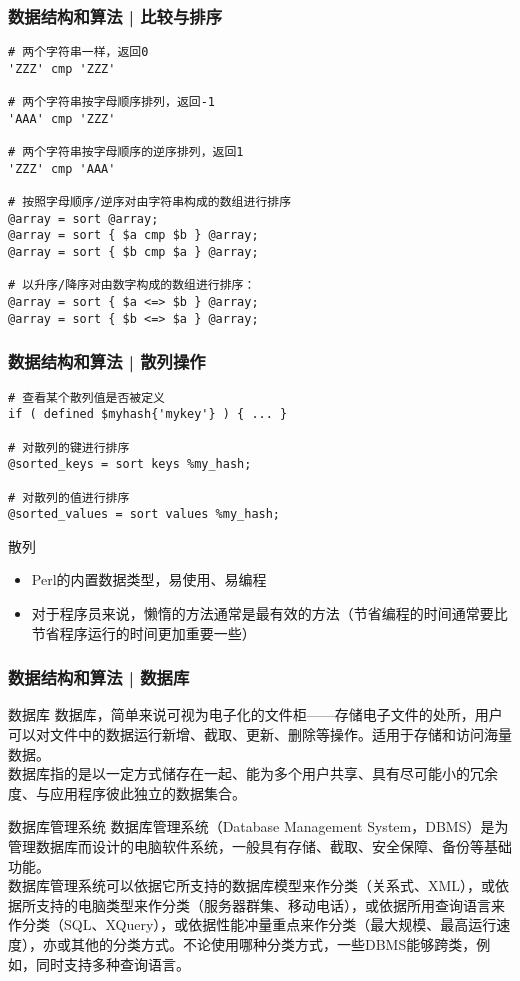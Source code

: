 \begin{frame}[fragile]
  \frametitle{数据结构和算法 | \alert{比较与排序}}
\begin{lstlisting}[basicstyle=\small\tt]
# 两个字符串一样，返回0
'ZZZ' cmp 'ZZZ'

# 两个字符串按字母顺序排列，返回-1
'AAA' cmp 'ZZZ'

# 两个字符串按字母顺序的逆序排列，返回1
'ZZZ' cmp 'AAA'

# 按照字母顺序/逆序对由字符串构成的数组进行排序
@array = sort @array;
@array = sort { $a cmp $b } @array;
@array = sort { $b cmp $a } @array;

# 以升序/降序对由数字构成的数组进行排序：
@array = sort { $a <=> $b } @array;
@array = sort { $b <=> $a } @array;
\end{lstlisting}
\end{frame}

\begin{frame}[fragile]
  \frametitle{数据结构和算法 | \alert{散列操作}}
\begin{lstlisting}
# 查看某个散列值是否被定义
if ( defined $myhash{'mykey'} ) { ... }

# 对散列的键进行排序
@sorted_keys = sort keys %my_hash;

# 对散列的值进行排序
@sorted_values = sort values %my_hash;
\end{lstlisting}
\pause
\begin{block}{散列}
  \begin{itemize}
    \item Perl的内置数据类型，易使用、易编程
    \item 对于程序员来说，懒惰的方法通常是最有效的方法（节省编程的时间通常要比节省程序运行的时间更加重要一些）
  \end{itemize}
\end{block}
\end{frame}

\begin{frame}
  \frametitle{数据结构和算法 | 数据库}
  \begin{block}{数据库}
    数据库，简单来说可视为电子化的文件柜——存储电子文件的处所，用户可以对文件中的数据运行新增、截取、更新、删除等操作。适用于存储和访问海量数据。\\
    \vspace{0.2em}
    数据库指的是以一定方式储存在一起、能为多个用户共享、具有尽可能小的冗余度、与应用程序彼此独立的数据集合。
  \end{block}
  \pause
  \begin{block}{数据库管理系统}
    数据库管理系统（Database Management System，DBMS）是为管理数据库而设计的电脑软件系统，一般具有存储、截取、安全保障、备份等基础功能。\\
    \vspace{0.1em}
    数据库管理系统可以依据它所支持的数据库模型来作分类（关系式、XML），或依据所支持的电脑类型来作分类（服务器群集、移动电话），或依据所用查询语言来作分类（SQL、XQuery），或依据性能冲量重点来作分类（最大规模、最高运行速度），亦或其他的分类方式。不论使用哪种分类方式，一些DBMS能够跨类，例如，同时支持多种查询语言。
  \end{block}
\end{frame}

